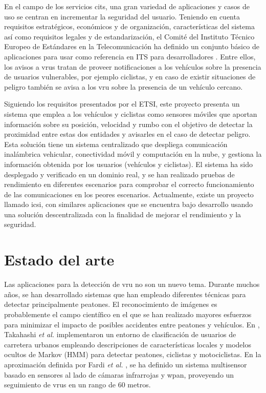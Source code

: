En el campo de los servicios \gls{cits}, una gran variedad de aplicaciones y
casos de uso se centran en incrementar la seguridad del usuario. Teniendo en
cuenta requisitos estratégicos, económicos y de organización, características
del sistema así como requisitos legales y de estandarización, el Comité del
Instituto Técnico Europeo de Estándares en la Telecomunicación ha definido un
conjunto básico de aplicaciones para usar como referencia en ITS para
desarrolladores \cite{etsi_2009}. Entre ellos, los avisos a \gls{vru}s tratan
de proveer notificaciones a los vehículos sobre la presencia de usuarios
vulnerables, por ejemplo ciclistas, y en caso de existir situaciones de peligro
también se avisa a los \gls{vru} sobre la presencia de un vehículo cercano.

Siguiendo los requisitos presentados por el ETSI, este proyecto presenta un
sistema que emplea a los vehículos y ciclistas como sensores móviles que
aportan información sobre su posición, velocidad y rumbo con el objetivo de
detectar la proximidad entre estas dos entidades y avisarles en el caso de
detectar peligro. Esta solución tiene un sistema centralizado que despliega
comunicación inalámbrica vehicular, conectividad móvil y computación en la
nube, y gestiona la información obtenida por los usuarios (vehículos y
ciclistas). El sistema ha sido desplegado y verificado en un dominio real, y
se han realizado pruebas de rendimiento en diferentes escenarios para comprobar
el correcto funcionamiento de las comunicaciones en los peores escenarios.
Actualmente, existe un proyecto llamado \gls{icsi}, con similares aplicaciones
que se encuentra bajo desarrollo usando una solución descentralizada con la
finalidad de mejorar el rendimiento y la seguridad.

\section{Estado del arte}\label{section:antecedentes}
Las aplicaciones para la detección de \gls{vru} no son un nuevo tema. Durante
muchos años, se han desarrollado sistemas que han empleado diferentes técnicas
para detectar principalmente peatones. El reconocimiento de imágenes es
probablemente el campo científico en el que se han realizado mayores esfuerzos
para minimizar el impacto de posibles accidentes entre peatones y vehículos.
En \cite{uru_classif}, Takahashi \emph{et al.} implementaron un entorno de
clasificación de usuarios de carretera urbanos empleando descripciones de
características locales y modelos ocultos de Markov (HMM) para detectar
peatones, ciclistas y motociclistas. En la aproximación definida por Fardi
\emph{et al.} \cite{vru_recognizion}, se ha definido un sistema multisensor
basado en sensores al lado de cámaras infrarrojas y \gls{wpan}, proveyendo un
seguimiento de \gls{vru}s en un rango de 60 metros.

